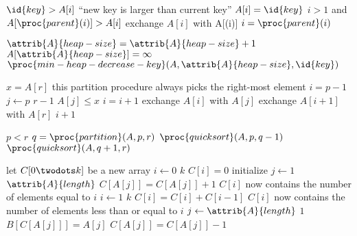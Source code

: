 \documentclass{article}
\begin{document}
\begin{codebox}
\li \If $\id{key} > A[i]$
\li     \Then
            \Error ``new key is larger than current key''
        \End
\li $A[i] = \id{key}$
\li \While $i > 1$ and $A[\proc{parent}(i)] > A[i]$
\li     \Do
            exchange $A[i]$ with A[(i)]
\li         $i = \proc{parent}(i)$
        \End
\end{codebox}

\begin{codebox}
\li $\attrib{A}{heap-size} = \attrib{A}{heap-size} + 1$
\li $A[\attrib{A}{heap-size}] = \infty$
\li $\proc{min-heap-decrease-key}(A, \attrib{A}{heap-size}, \id{key})$
\end{codebox}

\newpage

\begin{codebox}
\li $x = A[r]$ \Comment this partition procedure always picks the right-most element 
\li $i = p-1$
\li \For $j \gets p$ \To $r-1$
    \Do
\li     \If $A[j] \leq x$
            \Then
\li             $i = i + 1$
\li             exchange $A[i]$ with $A[j]$
            \End
    \End
\li exchange $A[i+1]$ with $A[r]$
\li \Return $i + 1$
\end{codebox}

\begin{codebox}
\li \If $p < r$
\li \Then
        $q = \proc{partition}(A, p, r)$
\li     $\proc{quicksort}(A, p, q-1)$
\li     $\proc{quicksort}(A, q+1, r)$
    \End
\end{codebox}

\begin{codebox}
\li let $C[0 \twodots k]$ be a new array
\li \For $i \gets 0$ \To $k$
\li \Do 
        $C[i] = 0$ \Comment initialize
    \End
\li \For $j \gets 1$ \To $\attrib{A}{length}$
\li \Do
        $C[A[j]] = C[A[j]] + 1$
    \End
\li \Comment $C[i]$ now contains the number of elements equal to $i$
\li \For $i \gets 1$ \To $k$
\li \Do
        $C[i] = C[i] + C[i-1]$
    \End
\li \Comment $C[i]$ now contains the number of elements less than or equal to $i$
\li \For $j \gets \attrib{A}{length}$ \Downto $1$
\li \Do
        $B[C[A[j]]] = A[j]$
\li    $C[A[j]] = C[A[j]] - 1$
    \End
\end{codebox}
\end{document}
